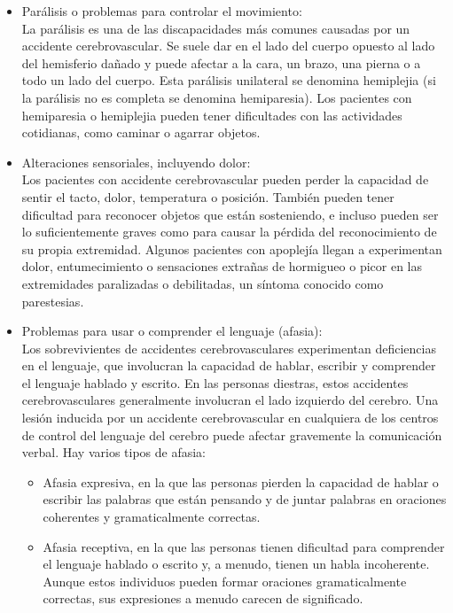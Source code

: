 \begin{itemize}
    \item Parálisis o problemas para controlar el movimiento: \\
    
    La parálisis es una de las discapacidades más comunes causadas por un accidente
    cerebrovascular. Se suele dar en el lado del cuerpo opuesto al lado del hemisferio   dañado y
    puede afectar a la cara, un brazo, una pierna o a todo un lado del cuerpo. Esta parálisis
    unilateral se denomina hemiplejia (si la parálisis no es completa se denomina
    hemiparesia). Los pacientes con hemiparesia o hemiplejia pueden tener dificultades con
    las actividades cotidianas, como caminar o agarrar objetos.~\cite{cuidadosalpacienteadulto}
    \item Alteraciones sensoriales, incluyendo dolor:\\
    Los pacientes con accidente cerebrovascular pueden perder la capacidad de sentir
    el tacto, dolor, temperatura o posición. También pueden tener dificultad para reconocer
    objetos que están sosteniendo, e incluso pueden ser lo suficientemente graves como para
    causar la pérdida del reconocimiento de su propia extremidad. Algunos pacientes con
    apoplejía llegan a experimentan dolor, entumecimiento o sensaciones extrañas de
    hormigueo o picor en las extremidades paralizadas o debilitadas, un síntoma conocido
    como parestesias.~\cite{post-strok}
    \item Problemas para usar o comprender el lenguaje (afasia):\\
    Los sobrevivientes de accidentes cerebrovasculares experimentan deficiencias en el lenguaje, 
    que involucran la capacidad de hablar, escribir y comprender el lenguaje hablado y escrito. 
    En las personas diestras, estos accidentes cerebrovasculares generalmente involucran el lado 
    izquierdo del cerebro. Una lesión inducida por un accidente cerebrovascular en cualquiera de 
    los centros de control del lenguaje del cerebro puede afectar gravemente la comunicación verbal. 
    Hay varios tipos de afasia:~\cite{post-strok}
    \begin{itemize}
        \item Afasia expresiva, en la que las personas pierden la capacidad de hablar o escribir las palabras que están pensando y de juntar palabras en oraciones coherentes y gramaticalmente correctas.
        \item Afasia receptiva, en la que las personas tienen dificultad para comprender el lenguaje hablado o escrito y, a menudo, tienen un habla incoherente. Aunque estos individuos pueden formar oraciones gramaticalmente correctas, sus expresiones a menudo carecen de significado.

\end{itemize}
\end{itemize}

